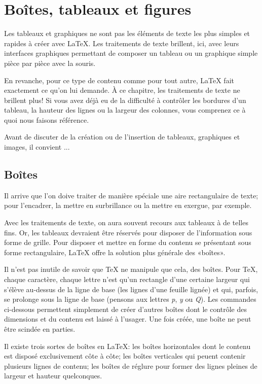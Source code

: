 \chapter{Boîtes, tableaux et figures}
\label{chap:tableaux}

Les tableaux et graphiques ne sont pas les éléments de texte les plus
simples et rapides à créer avec {\LaTeX}. Les traitements de texte
brillent, ici, avec leurs interfaces graphiques permettant de composer
un tableau ou un graphique simple pièce par pièce avec la souris.

En revanche, pour ce type de contenu comme pour tout autre, {\LaTeX}
fait exactement ce qu'on lui demande. À ce chapitre, les traitements
de texte ne brillent plus! Si vous avez déjà eu de la difficulté à
contrôler les bordures d'un tableau, la hauteur des lignes ou la
largeur des colonnes, vous comprenez ce à quoi nous faisons référence.

Avant de discuter de la création ou de l'insertion de tableaux,
graphiques et images, il convient ...


\section{Boîtes}
\label{sec:tableaux:boites}

Il arrive que l'on doive traiter de manière spéciale une aire
rectangulaire de texte; pour l'encadrer, la mettre en surbrillance ou
la mettre en exergue, par exemple.

Avec les traitements de texte, on aura souvent recours aux tableaux à
de telles fins. Or, les tableaux devraient être réservés pour disposer
de l'information sous forme de grille. Pour disposer et mettre en
forme du contenu se présentant sous forme rectangulaire, {\LaTeX}
offre la solution plus générale des «boîtes».

Il n'est pas inutile de savoir que {\TeX} ne manipule que cela, des
boîtes. Pour {\TeX}, chaque caractère, chaque lettre n'est qu'un
rectangle d'une certaine largeur qui s'élève au-dessus de la ligne de
base (les lignes d'une feuille lignée) et qui, parfois, se prolonge
sous la ligne de base (pensons aux lettres \emph{p}, \emph{y} ou
\emph{Q}). Les commandes ci-dessous permettent simplement de créer
d'autres boîtes dont le contrôle des dimensions et du contenu est
laissé à l'usager. Une fois créée, une boîte ne peut être scindée en
parties.

Il existe trois sortes de boîtes en {\LaTeX}: les boîtes horizontales
dont le contenu est disposé exclusivement côte à côte; les boîtes
verticales qui peu\-ent contenir plusieurs lignes de contenu; les
boîtes de réglure pour former des lignes pleines de largeur et hauteur
quelconques.


